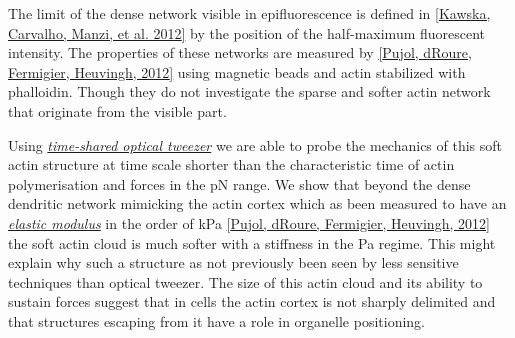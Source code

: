 \documentclass[A4paperpaper,11pt,english]{sphinxmanual}
\begin{document}
The limit of the dense network visible in epifluorescence is defined in
{\hyperref[parts/part3:kawska2012]{{[}Kawska, Carvalho, Manzi,  et al.  2012{]}}} by the position of the half-maximum fluorescent intensity.
The properties of these networks are measured by {\hyperref[parts/part3:pujol2012]{{[}Pujol, dRoure, Fermigier, Heuvingh,  2012{]}}} using
magnetic beads and actin stabilized with phalloidin. Though they do not
investigate the sparse and softer actin network that originate from the visible
part.

Using {\hyperref[parts/part2:time-shared-ot]{\emph{time-shared optical tweezer}}} we are able to probe
the mechanics of this soft actin structure at time scale shorter than the
characteristic time of actin polymerisation and forces in the pN range. We show
that beyond the dense dendritic network mimicking the actin cortex which as
been measured to have an {\hyperref[parts/part1:elastic-modulus]{\emph{elastic modulus}}} in the order of
kPa {\hyperref[parts/part3:pujol2012]{{[}Pujol, dRoure, Fermigier, Heuvingh,  2012{]}}} the soft actin cloud is much softer with
a stiffness in the Pa regime.  This might explain why such a
structure as not previously been seen by less sensitive techniques than optical
tweezer. The size of this actin cloud and its ability to sustain forces
suggest that in cells the actin cortex is not sharply delimited and that
structures escaping from it have a role in organelle positioning.
\end{document}
